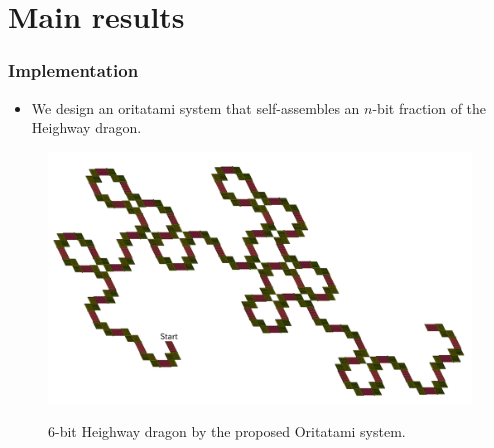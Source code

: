 \documentclass[dvipdfmx,10pt]{beamer}
\begin{document}
\section{Main results}

\begin{frame}\frametitle{Implementation}

\begin{itemize}
\item We design an oritatami system that self-assembles an $n$-bit fraction of the Heighway dragon.
\end{itemize}
\begin{figure}[H]
  	\centering
	\href{run:Dragon.mp4}{
	\includegraphics[width=0.7\linewidth]{6bit.pdf}
	}
	\caption{6-bit Heighway dragon by the proposed Oritatami system.}
\end{figure}

\end{frame}
\end{document}

